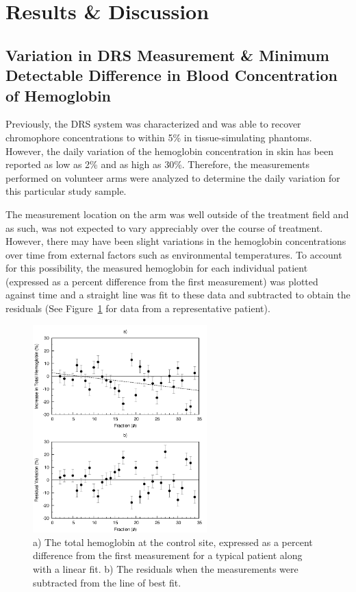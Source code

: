 \section{Results \& Discussion}

\subsection{Variation in DRS Measurement \& Minimum Detectable Difference in Blood Concentration of Hemoglobin}
Previously, the DRS system was characterized and was able to recover chromophore concentrations to within 5\% in tissue-simulating phantoms.\cite{Glennie2014b} However, the daily variation of the hemoglobin concentration in skin has been reported as low as 2\% and as high as 30\%.\cite{Brown1946} Therefore, the measurements performed on volunteer arms were analyzed to determine the daily variation for this particular study sample.

The measurement location on the arm was well outside of the treatment field and as such, was not expected to vary appreciably over the course of treatment. However, there may have been slight variations in the hemoglobin concentrations over time from external factors such as environmental temperatures. To account for this possibility, the measured hemoglobin for each individual patient (expressed as a percent difference from the first measurement) was plotted against time and a straight line was fit to these data and subtracted to obtain the residuals (See Figure~\ref{fig:p4-daily_var} for data from a representative patient).

\begin{figure}
	\centering \includegraphics[width=0.6\textwidth]{figures/p4-daily_var.png}
	\caption[Sample daily variation of hemoglobin in control site]{\label{fig:p4-daily_var}a) The total hemoglobin at the control site, expressed as a percent difference from the first measurement for a typical patient along with a linear fit. b) The residuals when the measurements were subtracted from the line of best fit.}
\end{figure}


